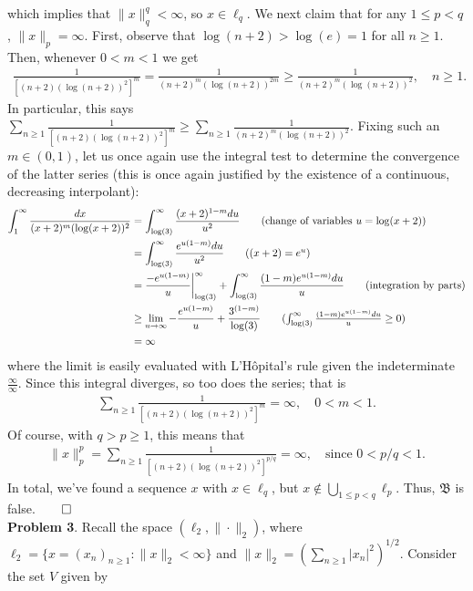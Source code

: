\documentclass[10pt]{article}
\newcommand{\1}[1]{\mathbbm{1}_{#1}}
\begin{document}
    which implies that $\|x\|_q^q<\infty$, so $x\in\ell_q$. We next claim that
    for any $1\leq p<q$, $\|x\|_p=\infty$. First, observe that
    $\log(n+2)>\log(e)=1$ for all $n\geq 1$. Then, whenever $0<m<1$ we get
    \begin{align*}
        \frac{1}{[(n+2)(\log(n+2))^2]^m}=\frac{1}{(n+2)^m(\log(n+2))^{2m}}\geq\frac{1}{(n+2)^m(\log(n+2))^2},\quad n\geq 1.
    \end{align*}
    In particular, this says $\sum_{n\geq
    1}\tfrac{1}{[(n+2)(\log(n+2))^2]^m}\geq\sum_{n\geq
    1}\frac{1}{(n+2)^m(\log(n+2))^2}$. Fixing such an $m\in(0,1)$, let us once
    again use the integral test to determine the convergence of the latter
    series (this is once again justified by the existence of a continuous,
    decreasing interpolant):
    \begin{align*}
        \int_1^\infty\frac{dx}{(x+2)^m(\log(x+2))^2}&=\int_{\log(3)}^\infty\frac{(x+2)^{1-m}du}{u^2}\tag{change of variables $u=\log(x+2)$}\\
        &=\int_{\log(3)}^\infty\frac{e^{u(1-m)}du}{u^2}\tag{$(x+2)=e^u$}\\
        &=\frac{-e^{u(1-m)}}{u}\bigg|_{\log(3)}^\infty+\int_{\log(3)}^\infty\frac{(1-m)e^{u(1-m)}du}{u}\tag{integration by parts}\\
        &\geq \lim_{u\rightarrow\infty}-\frac{e^{u(1-m)}}{u}+\frac{3^{(1-m)}}{\log(3)}\tag{$\int_{\log(3)}^\infty\tfrac{(1-m)e^{u(1-m)}du}{u}\geq 0$}\\
        &=\infty
    \end{align*} 
    where the limit is easily evaluated with L'H\^opital's rule given the
    indeterminate $\tfrac{\infty}{\infty}$. Since this integral diverges, so too
    does the series; that is
    \begin{align*}
        \sum_{n\geq 1}\frac{1}{[(n+2)(\log(n+2))^2]^m}=\infty,\quad 0<m<1.
    \end{align*}
    Of course, with $q>p\geq 1$, this means that
    \begin{align*}
        \|x\|_p^p=\sum_{n\geq 1}\frac{1}{[(n+2)(\log(n+2))^2]^{p/q}}=\infty,\quad\text{since $0<p/q<1$.}
    \end{align*}
    In total, we've found a sequence $x$ with $x\in\ell_q$, but
    $x\notin\bigcup_{1\leq p<q}\ell_p$. Thus, $\mathfrak{B}$ is
    false.\hfill{$\qed$}\\[5pt]
    {\bf Problem 3}. Recall the space $(\ell_2,\|\cdot\|_2)$, where
    $\ell_2=\{x=(x_n)_{n\geq 1}:\|x\|_2<\infty\}$ and $\|x\|_2=\left(\sum_{n\geq
    1}|x_n|^2\right)^{1/2}$. Consider the set $V$ given by
\end{document}
